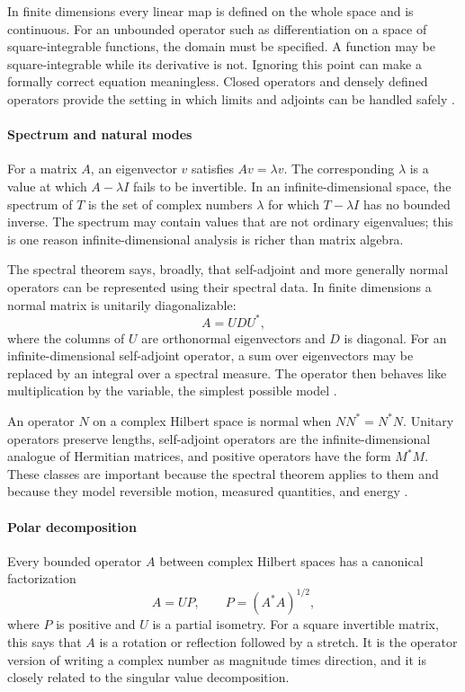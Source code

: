 In finite dimensions every linear map is defined on the whole space and is continuous. For an unbounded operator such as differentiation on a space of square-integrable functions, the domain must be specified. A function may be square-integrable while its derivative is not. Ignoring this point can make a formally correct equation meaningless. Closed operators and densely defined operators provide the setting in which limits and adjoints can be handled safely \cite{operator_theory_ref1,operator_theory_ref2}.

\paragraph{Spectrum and natural modes}
For a matrix $A$, an eigenvector $v$ satisfies $Av=\lambda v$. The corresponding $\lambda$ is a value at which $A-\lambda I$ fails to be invertible. In an infinite-dimensional space, the spectrum of $T$ is the set of complex numbers $\lambda$ for which $T-\lambda I$ has no bounded inverse. The spectrum may contain values that are not ordinary eigenvalues; this is one reason infinite-dimensional analysis is richer than matrix algebra.

The spectral theorem says, broadly, that self-adjoint and more generally normal operators can be represented using their spectral data. In finite dimensions a normal matrix is unitarily diagonalizable:
\[
A=UDU^*,
\]
where the columns of $U$ are orthonormal eigenvectors and $D$ is diagonal. For an infinite-dimensional self-adjoint operator, a sum over eigenvectors may be replaced by an integral over a spectral measure. The operator then behaves like multiplication by the variable, the simplest possible model \cite{operator_theory_ref1,operator_theory_ref4}.

An operator $N$ on a complex Hilbert space is normal when $NN^*=N^*N$. Unitary operators preserve lengths, self-adjoint operators are the infinite-dimensional analogue of Hermitian matrices, and positive operators have the form $M^*M$. These classes are important because the spectral theorem applies to them and because they model reversible motion, measured quantities, and energy \cite{operator_theory_ref1}.

\paragraph{Polar decomposition}
Every bounded operator $A$ between complex Hilbert spaces has a canonical factorization
\[
A=UP,\qquad P=(A^*A)^{1/2},
\]
where $P$ is positive and $U$ is a partial isometry. For a square invertible matrix, this says that $A$ is a rotation or reflection followed by a stretch. It is the operator version of writing a complex number as magnitude times direction, and it is closely related to the singular value decomposition.

